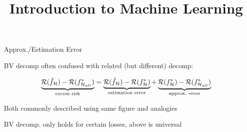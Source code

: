 \documentclass[11pt,compress,t,notes=noshow, xcolor=table]{beamer}
\title{Introduction to Machine Learning}
\begin{document}
    


\begin{framei}[sep=M]{Approx./Estimation Error }

\item BV decomp often confused with related (but different) decomp: 

$$
    \underbrace{\mathcal{R}(\hat f_{\mathcal{H}}) - \mathcal{R}(f^{\ast}_{\mathcal{H}_{all}})}_{\text{excess risk}} = \underbrace{\mathcal{R}(\hat f_{\mathcal{H}}) - \mathcal{R}(f^{\ast}_{\mathcal{H}})}_{\text{estimation error}} + \underbrace{\mathcal{R}(f^{\ast}_{\mathcal{H}}) -  \mathcal{R}(f^{\ast}_{\mathcal{H}_{all}})}_{\text{approx. error}} 
$$

\item Both commonly described using same figure and analogies


\vfill


\item BV decomp. only holds for certain losses, above is universal


\end{framei}
\end{document}
